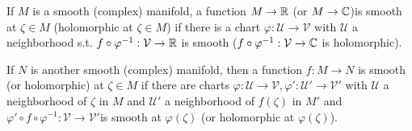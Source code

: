 \begin{definition}
  If $M$ is a smooth (complex) manifold, a function $M\to \mathbb{R}$ (or $M\to \mathbb{C}$)is smooth at $\zeta \in M$ (holomorphic at $\zeta \in M$) if there is a chart $\varphi:\mathcal{U}\to \mathcal{V}$ with $\mathcal{U}$ a neighborhood s.t. $f\circ \varphi^{-1}:\mathcal{V}\to \mathbb{R}$ is smooth ($f\circ \varphi^{-1}:\mathcal{V}\to \mathbb{C}$ is holomorphic). 

  If $N$ is another smooth (complex) manifold, then a function $f:M\to N$ is smooth (or holomorphic) at $\zeta \in M$ if there are charts $\varphi:\mathcal{U}\to \mathcal{V},\varphi':\mathcal{U}'\to \mathcal{V}'$ with $\mathcal{U}$ a neighborhood of $\zeta$ in $M$ and $\mathcal{U'}$ a neighborhood of $f(\zeta)$ in $M'$ and $\varphi'\circ f\circ \varphi^{-1}:\mathcal{V}\to \mathcal{V}'$is smooth at $\varphi(\zeta)$ (or holomorphic at $\varphi(\zeta)$).
\end{definition}


